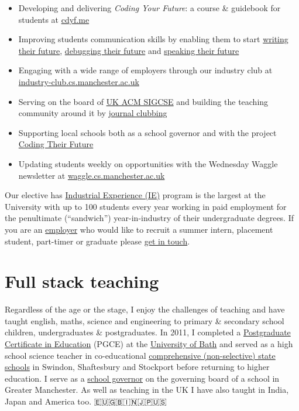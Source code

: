\documentclass[
  12pt,
]{book}
\providecommand{\tightlist}{%
  \setlength{\itemsep}{0pt}\setlength{\parskip}{0pt}}
\begin{document}
\begin{itemize}
\tightlist
\item
  Developing and delivering \emph{Coding Your Future}: a course \& guidebook for students at \href{https://www.cdyf.me}{cdyf.me}
\item
  Improving students communication skills by enabling them to start \href{https://www.cdyf.me/writing}{writing their future}, \href{https://www.cdyf.me/debugging}{debugging their future} and \href{https://www.cdyf.me/speaking}{speaking their future}
\item
  Engaging with a wide range of employers through our industry club at \href{https://industry-club.cs.manchester.ac.uk}{industry-club.cs.manchester.ac.uk}
\item
  Serving on the board of \href{https://uki-sigcse.acm.org}{UK ACM SIGCSE} and building the teaching community around it by \href{https://uki-sigcse.acm.org/journal-club/}{journal clubbing}
\item
  Supporting local schools both as a school governor and with the project \href{https://personalpages.manchester.ac.uk/staff/duncan.hull/coding-their-future}{Coding Their Future}
\item
  Updating students weekly on opportunities with the Wednesday Waggle newsletter at \href{https://waggle.cs.manchester.ac.uk}{waggle.cs.manchester.ac.uk} 🐝
\end{itemize}

Our elective has \href{https://industry-club.cs.manchester.ac.uk/experience.html}{Industrial Experience (IE)} program is the largest at the University with up to 100 students every year working in paid employment for the penultimate (``sandwich'') year-in-industry of their undergraduate degrees. If you are an \href{https://industry-club.cs.manchester.ac.uk}{employer} who would like to recruit a summer intern, placement student, part-timer or graduate please \href{https://industry-club.cs.manchester.ac.uk/contact.htmld}{get in touch}.

\section*{Full stack teaching}\label{full-stack-teaching}

Regardless of the age or the stage, I enjoy the challenges of teaching and have taught english, maths, science and engineering to primary \& secondary school children, undergraduates \& postgraduates. In 2011, I completed a \href{https://en.wikipedia.org/wiki/Postgraduate_Certificate_in_Education}{Postgraduate Certificate in Education} (PGCE) at the \href{https://www.bath.ac.uk/}{University of Bath} and served as a high school science teacher in co-educational \href{https://www.gov.uk/types-of-school}{comprehensive (non-selective) state schools} in Swindon, Shaftesbury and Stockport before returning to higher education. I serve as a \href{https://www.manchester.ac.uk/connect/teachers/school-governors/}{school governor} on the governing board of a school in Greater Manchester. As well as teaching in the UK I have also taught in India, Japan and America too. 🇪🇺🇬🇧🇮🇳🇯🇵🇺🇸
\end{document}
